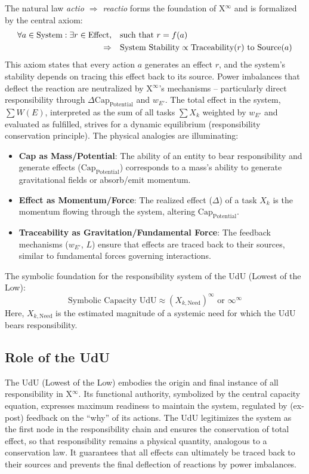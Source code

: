 \documentclass[12pt]{scrartcl}
\begin{document}
The natural law \emph{actio $\Rightarrow$ reactio} forms the foundation of X$^\infty$ and is formalized by the central axiom:
\begin{align}
\forall a \in \text{System}: \exists r \in \text{Effect}, \quad &\text{such that } r = f(a) \notag \\
\Rightarrow \quad &\text{System Stability} \propto \text{Traceability}(r) \text{ to Source}(a)
\end{align}
This axiom states that every action $a$ generates an effect $r$, and the system’s stability depends on tracing this effect back to its source. Power imbalances that deflect the reaction are neutralized by X$^\infty$’s mechanisms – particularly direct responsibility through $\Delta\text{Cap}_{\text{Potential}}$ and $w_{E'}$. The total effect in the system, $\sum W(E)$, interpreted as the sum of all tasks $\sum X_k$ weighted by $w_{E'}$ and evaluated as fulfilled, strives for a dynamic equilibrium (responsibility conservation principle). The physical analogies are illuminating:
\begin{itemize}
    \item \textbf{Cap as Mass/Potential}: The ability of an entity to bear responsibility and generate effects ($\text{Cap}_{\text{Potential}}$) corresponds to a mass’s ability to generate gravitational fields or absorb/emit momentum.
    \item \textbf{Effect as Momentum/Force}: The realized effect ($\Delta$) of a task $X_k$ is the momentum flowing through the system, altering $\text{Cap}_{\text{Potential}}$.
    \item \textbf{Traceability as Gravitation/Fundamental Force}: The feedback mechanisms ($w_{E'}$, $L$) ensure that effects are traced back to their sources, similar to fundamental forces governing interactions.
\end{itemize}

The symbolic foundation for the responsibility system of the UdU (Lowest of the Low):
\begin{equation}
\text{Symbolic Capacity UdU} \approx (X_{k, \text{Need}})^\infty \text{ or } \infty^\infty
\end{equation}
Here, $X_{k,\text{Need}}$ is the estimated magnitude of a systemic need for which the UdU bears responsibility.

\subsection{Role of the UdU}
\label{sec:UdU}
The UdU (Lowest of the Low) embodies the origin and final instance of all responsibility in X$^\infty$. Its functional authority, symbolized by the central capacity equation, expresses maximum readiness to maintain the system, regulated by (ex-post) feedback on the “why” of its actions. The UdU legitimizes the system as the first node in the responsibility chain and ensures the conservation of total effect, so that responsibility remains a physical quantity, analogous to a conservation law. It guarantees that all effects can ultimately be traced back to their sources and prevents the final deflection of reactions by power imbalances.
\end{document}
